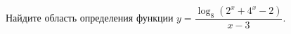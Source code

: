 \begin{ex}
	\begin{condition}
		Найдите область определения функции $y = \dfrac{\log_8 (2^x + 4^x - 2)}{x - 3}.$
	\end{condition}
\end{ex}